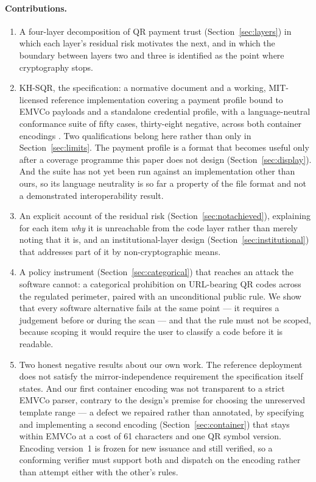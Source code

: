 \documentclass[10pt,a4paper,twocolumn]{article}
\begin{document}
\paragraph{Contributions.}
\begin{enumerate}[leftmargin=1.6em]
  \item A four-layer decomposition of QR payment trust (Section~\ref{sec:layers})
    in which each layer's residual risk motivates the next, and in which the
    boundary between layers two and three is identified as the point where
    cryptography stops.
  \item KH-SQR, the specification: a normative document and a working, MIT-licensed reference
    implementation covering a payment profile bound to EMVCo payloads and a
    standalone credential profile, with a language-neutral conformance suite of
    fifty cases, thirty-eight negative, across both container encodings
    \citep{khsqr2026repo}. Two qualifications belong here rather than only in
    Section~\ref{sec:limits}. The payment profile is a format that becomes
    useful only after a coverage programme this paper does not design
    (Section~\ref{sec:display}). And the suite has not yet been run against an
    implementation other than ours, so its language neutrality is so far a
    property of the file format and not a demonstrated interoperability
    result.
  \item An explicit account of the residual risk (Section~\ref{sec:notachieved}),
    explaining for each item \emph{why} it is unreachable from the code layer
    rather than merely noting that it is, and an institutional-layer design
    (Section~\ref{sec:institutional}) that addresses part of it by
    non-cryptographic means.
  \item A policy instrument (Section~\ref{sec:categorical}) that reaches an
    attack the software cannot: a categorical prohibition on URL-bearing QR
    codes across the regulated perimeter, paired with an unconditional public
    rule. We show that every software alternative fails at the same point ---
    it requires a judgement before or during the scan --- and that the rule must
    not be scoped, because scoping it would require the user to classify a code
    before it is readable.
  \item Two honest negative results about our own work. The reference deployment
    does not satisfy the mirror-independence requirement the specification itself
    states. And our first container encoding was not transparent to a strict
    EMVCo parser, contrary to the design's premise for choosing the unreserved
    template range --- a defect we repaired rather than annotated, by specifying
    and implementing a second encoding (Section~\ref{sec:container}) that stays
    within EMVCo at a cost of 61 characters and one QR symbol version. Encoding
    version~1 is frozen for new issuance and still verified, so a conforming
    verifier must support both and dispatch on the encoding rather than attempt
    either with the other's rules.
\end{enumerate}
\end{document}
